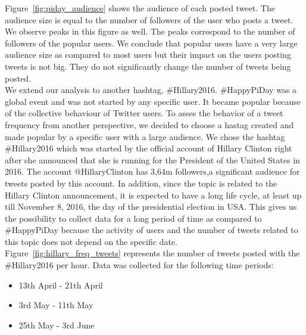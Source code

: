 \documentclass[journal, a4paper, 12pt]{article}
\begin{document}
Figure~\ref{fig:piday_audience} shows the audience of each posted tweet. The audience size is equal to the number of followers of the user who posts a tweet. We observe peaks in this figure as well. The peaks correspond to the number of followers of the popular users. We conclude that popular users have a very large audience size as compared to most users but their impact on the users posting tweets is not big. They do not significantly change the number of tweets being posted. 
\\
      
    
We extend our analysis to another hashtag, \#Hillary2016. \#HappyPiDay was a global event and was not started by any specific user. It became popular because of the collective behaviour of Twitter users. To asses the behavior of a tweet frequency from another perspective, we decided to choose a hastag created and made popular by a specific user with a large audience. We chose the hashtag \#Hillary2016 which was started by the official account of Hillary Clinton right after she announced that she is running for the President of the United States in 2016. The account @HillaryClinton has 3,64m followers,a significant audience for tweets posted by this account. In addition, since the topic is related to the Hillary Clinton announcement, it is expected to have a long life cycle, at least up till November 8, 2016, the day of the presidential election in USA. This gives us the possibility to collect data for a long period of time as compared to \#HappyPiDay because the activity of users and the number of tweets related to this topic does not depend on the specific date.
\\

Figure~\ref{fig:hillary_freq_tweets} represents the number of tweets posted with the \#Hillary2016 per hour. Data was collected for the following time periods:
\begin{itemize}
\item 13th April - 21th April
\item 3rd May - 11th May
\item 25th May - 3rd June
\end{itemize}
\end{document}
